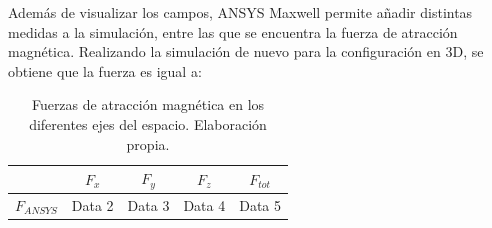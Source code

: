 Además de visualizar los campos, ANSYS Maxwell permite añadir distintas medidas a la simulación, entre las que se encuentra la fuerza de atracción magnética. Realizando la simulación de nuevo para la configuración en 3D, se obtiene que la fuerza es igual a:

\begin{table}[h]
    \centering
    \begin{tabular}{|c|c|c|c|c|}
        \hline
        & \(F_x\) & \(F_y\) & \(F_z\) & \(F_{tot}\) \\
        \hline
        \(F_{ANSYS}\) & Data 2 & Data 3 & Data 4 & Data 5 \\
        \hline
    \end{tabular}
    \caption{Fuerzas de atracción magnética en los diferentes ejes del espacio. Elaboración propia.}
    \label{tab:fuerzas}
\end{table}
